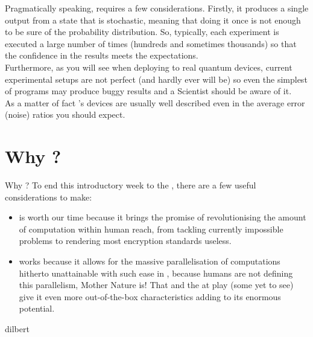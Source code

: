 \documentclass[aspectratio=43]{beamer}
\begin{document}
\begin{frame}{\qmt}
\begin{cardTiny}
\small{
    Pragmatically speaking, \qmt requires a few considerations. Firstly, it produces a single output from a state that is stochastic, meaning that doing it once is not enough to be sure of the probability distribution. So, typically, each experiment is executed a large number of times (hundreds and sometimes thousands) so that the confidence in the results meets the expectations.\\
    Furthermore, as you will see when deploying to real quantum devices, current experimental setups are not perfect (and hardly ever will be) so even the simplest of programs may produce buggy results and a \q Scientist should be aware of it.\\As a matter of fact \href{https://quantumexperience.ng.bluemix.net/qx/editor}{\ibmqe}'s devices are usually well described even in the average error (noise) ratios you should expect.
}
\end{cardTiny}
\pagenumber
\end{frame}

\section{Why \q?}
\begin{frame}{Why \q?}
    To end this introductory week to the \qw, there are a few useful considerations to make:
    \begin{itemize}
        \item \qc is worth our time because it brings the promise of revolutionising the amount of computation within human reach, from tackling currently impossible problems to rendering most encryption standards useless.
        \item \qc works because it allows for the massive parallelisation of computations hitherto unattainable with such ease in \cc, because humans are not defining this parallelism, Mother Nature is! That and the \qm at play (some yet to see) give it even more out-of-the-box characteristics adding to its enormous potential. 
    \end{itemize}
\pagenumber
\end{frame}

\begin{frameImg}[width]{dilbert}


\end{frameImg}
\end{document}
